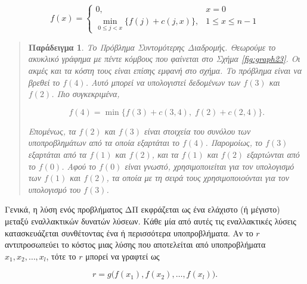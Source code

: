 \documentclass[12pt,a4paper]{article} %
\newtheorem{paradeigma}{Παράδειγμα}
\begin{document}
{{\begin{equation}
f(x) =
\begin{cases}
0, & x = 0 \\
\displaystyle \min_{0 \le j < x} \{ f(j) + c(j,x) \}, & 1 \le x \le n-1
\end{cases}
\label{eq:relation12}
\end{equation}


\begin{quote}
\begin{paradeigma} \label{par:2} Το Πρόβλημα Συντομότερης Διαδρομής.
Θεωρούμε το ακυκλικό γράφημα με πέντε κόμβους που φαίνεται στο Σχήμα \ref{fig:graph23}. Οι ακμές και τα κόστη τους είναι επίσης εμφανή στο σχήμα.
Το πρόβλημα είναι να βρεθεί το $f(4)$. Αυτό μπορεί να υπολογιστεί δεδομένων των $f(3)$ και $f(2)$.
Πιο συγκεκριμένα,

\[
f(4) = \min \{ f(3) + c(3,4), \; f(2) + c(2,4) \}.
\]

Επομένως, τα $f(2)$ και $f(3)$ είναι στοιχεία του συνόλου των υποπροβλημάτων
από τα οποία εξαρτάται το $f(4)$. Παρομοίως, το $f(3)$ εξαρτάται από τα $f(1)$ και $f(2)$,
και τα $f(1)$ και $f(2)$ εξαρτώνται από το $f(0)$. Αφού το $f(0)$ είναι γνωστό, χρησιμοποιείται για τον υπολογισμό των $f(1)$ και $f(2)$, 
τα οποία με τη σειρά τους χρησιμοποιούνται για τον υπολογισμό του $f(3)$.
\end{paradeigma}
\end{quote}

\par\vspace{0.3cm}
Γενικά, η λύση ενός προβλήματος ΔΠ εκφράζεται ως ένα ελάχιστο 
(ή μέγιστο) μεταξύ εναλλακτικών δυνατών λύσεων. Κάθε μία από αυτές τις εναλλακτικές λύσεις 
κατασκευάζεται συνθέτοντας ένα ή περισσότερα υποπροβλήματα. Αν το $r$ αντιπροσωπεύει το κόστος 
μιας λύσης που αποτελείται από υποπροβλήματα $x_1, x_2, \ldots, x_l$, τότε το $r$ μπορεί να 
γραφτεί ως

\[
r = g\bigl(f(x_1), f(x_2), \ldots, f(x_l)\bigr).
\]

\begin{figure}[H]
\centering
{}
\end{figure}}}
\end{document}

